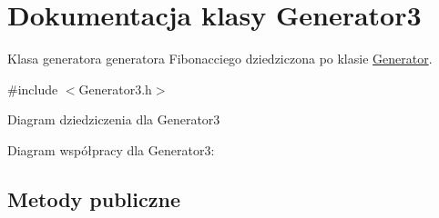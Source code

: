 \hypertarget{classGenerator3}{\section{Dokumentacja klasy Generator3}
\label{classGenerator3}
}


Klasa generatora generatora Fibonacciego dziedziczona po klasie \hyperlink{classGenerator}{Generator}.  




{\ttfamily \#include $<$Generator3.\+h$>$}



Diagram dziedziczenia dla Generator3


Diagram współpracy dla Generator3\+:
\subsection*{Metody publiczne}
